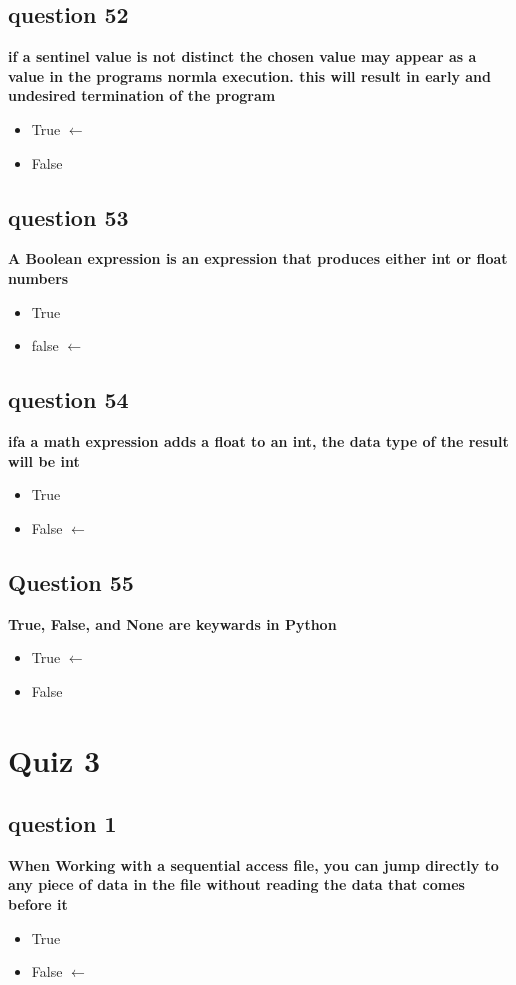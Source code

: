\documentclass[10pt]{article}
\begin{document}
\subsection*{question 52}
\textbf{if a sentinel value is not distinct the chosen value may appear as a value in the programs normla execution. this will result in early and undesired termination of the program}
\begin{itemize}
\item True $\leftarrow$
\item False
\end{itemize}
\subsection*{question 53}
\textbf{A Boolean expression is an expression that produces either int or float numbers}
\begin{itemize}
\item True
\item false $\leftarrow$
\end{itemize}
\subsection*{question 54}
\textbf{ifa a math expression adds a float to an int, the data type of the result will be int}
\begin{itemize}
\item True
\item False $\leftarrow$
\end{itemize}
\subsection*{Question 55}
\textbf{True, False, and None are keywards in Python}
\begin{itemize}
\item True $\leftarrow$
\item False
\end{itemize}
\break
\section*{Quiz 3}
\subsection*{question 1}
\textbf{When Working with a sequential access file, you can jump directly to any piece of data in the file without reading the data that comes before it}
\begin{itemize}
\item True
\item False $\leftarrow$ 
\end{itemize}
\end{document}
